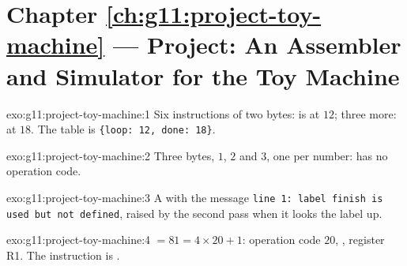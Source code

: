 \section*{Chapter \ref{ch:g11:project-toy-machine} --- Project: An Assembler and Simulator for the Toy Machine}

\begin{solution}{exo:g11:project-toy-machine:1}
Six instructions of two bytes:  is at $12$; three more:  at $18$. The table is
\texttt{\{\textquotesingle{}loop\textquotesingle{}: 12, \textquotesingle{}done\textquotesingle{}: 18\}}.
\end{solution}

\begin{solution}{exo:g11:project-toy-machine:2}
Three bytes, $1$, $2$ and $3$, one per number:  has no operation code.
\end{solution}

\begin{solution}{exo:g11:project-toy-machine:3}
A  with the message \texttt{line 1: label \textquotesingle{}finish\textquotesingle{} is used but not defined}, raised by the second
pass when it looks the label up.
\end{solution}

\begin{solution}{exo:g11:project-toy-machine:4}
 $= 81 = 4 \times 20 + 1$: operation code $20$, , register R1. The instruction is
.
\end{solution}

